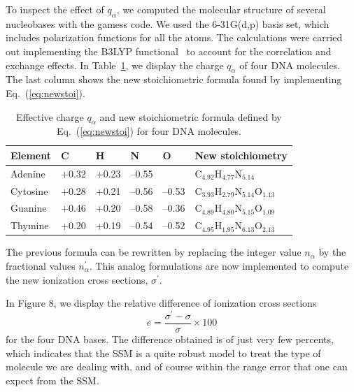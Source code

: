 \documentclass[preprint,12pt]{article}
\begin{document}
To inspect the effect of $q_{\alpha}$, we computed the molecular
structure of several nucleobases with the {\sc gamess} code. We 
used the 6-31G(d,p) basis set, which includes polarization 
functions for all the atoms. The calculations were carried out 
implementing the B3LYP functional~\cite{Becke1993,Stephens1994} to 
account for the correlation and exchange effects. 
In Table~\ref{tab:newstoi}, we display the charge $q_{\alpha}$ of four 
DNA molecules. The last column shows the new stoichiometric formula
found by implementing Eq.~(\ref{eq:newstoi}).
\begin{table}[H]
\begin{center}
\begin{tabular}{|p{}|p{}|p{}|p{
}|p{}|p{}|}
\hline
Element & C & H & N & O & New stoichiometry \\
\hline
Adenine & +0.32 & +0.23 & --0.55 &       & 
C$_{4.92}$H$_{4.77}$N$_{5.14}$ \\ 
\hline
Cytosine & +0.28 & +0.21 & --0.56 & --0.53 & 
C$_{3.93}$H$_{2.79}$N$_{5.14}$O$_{1.13}$ \\ 
\hline
Guanine & +0.46 & +0.20 & --0.58 & --0.36 & 
C$_{4.89}$H$_{4.80}$N$_{5.15}$O$_{1.09}$ \\ 
\hline
Thymine & +0.20 & +0.19 & --0.54 & --0.52 & 
C$_{4.95}$H$_{1.95}$N$_{6.13}$O$_{2.13}$ \\ 
\hline
\end{tabular}
\caption{Effective charge $q_{\alpha}$ and new stoichiometric formula 
defined by Eq.~(\ref{eq:newstoi}) for four DNA molecules.}
\label{tab:newstoi}
\end{center}
\end{table}

The previous formula can be rewritten by replacing the integer value 
$n_{\alpha}$ by the fractional values $n_{\alpha}^{\prime}$. This 
analog formulations are now implemented to compute the new ionization 
cross sections, $\sigma^{\prime}$.

In Figure 8, we display the relative difference of ionization cross 
sections 
\begin{equation}
e=\frac{\sigma^{\prime}-\sigma}{\sigma}\times 100
\label{120}
\end{equation}
for the four DNA bases. The difference obtained is of just very few 
percents, which indicates that the SSM is a quite robust model to treat 
the type of molecule we are dealing with, and of course within the 
range error that one can expect from the SSM.
\end{document}
